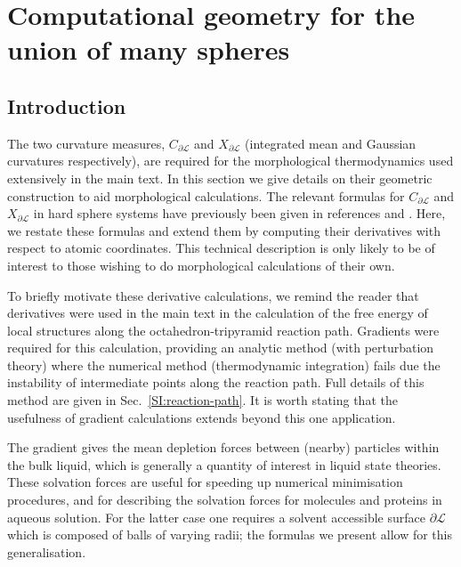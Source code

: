 \documentclass[11pt,twoside]{report}
\begin{document}
\chapter{Computational geometry for the union of many spheres}
\label{appendix:computational-geometry}

\section{Introduction}

The two curvature measures, $C_{\partial\mathcal{L}}$ and $X_{\partial\mathcal{L}}$ (integrated mean and Gaussian curvatures respectively), are required for the morphological thermodynamics used extensively in the main text.
In this section we give details on their geometric construction to aid morphological calculations.
The relevant formulas for $C_{\partial\mathcal{L}}$ and $X_{\partial\mathcal{L}}$ in hard sphere systems have previously been given in references \cite{MeckeAA1994} and \cite{RothPRL2006}.
Here, we restate these formulas and extend them by computing their derivatives with respect to atomic coordinates.
This technical description is only likely to be of interest to those wishing to do morphological calculations of their own.

To briefly motivate these derivative calculations, we remind the reader that derivatives were used in the main text in the calculation of the free energy of local structures along the octahedron-tripyramid reaction path.
Gradients were required for this calculation, providing an analytic method (with perturbation theory) where the numerical method (thermodynamic integration) fails due the instability of intermediate points along the reaction path.
Full details of this method are given in Sec.\ \ref{SI:reaction-path}.
It is worth stating that the usefulness of gradient calculations extends beyond this one application.

The gradient gives the mean depletion forces between (nearby) particles within the bulk liquid, which is generally a quantity of interest in liquid state theories.
These solvation forces are useful for speeding up numerical minimisation procedures, and for describing the solvation forces for molecules and proteins in aqueous solution.
For the latter case one requires a solvent accessible surface $\partial{\mathcal{L}}$ which is composed of balls of varying radii; the formulas we present allow for this generalisation.
\end{document}
